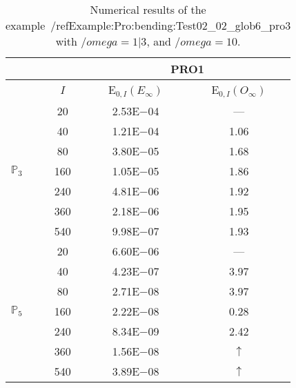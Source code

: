 \begin{table}[H]
\caption{Numerical results of the example~/ref{Example:Pro:bending:Test02_02_glob6_pro3} with $/omega=1|3$, and $/omega=10$.}
\setlength{\tabcolsep}{5pt}
\centering
\begin{tabular}{@{}l c c c@{}}
\toprule
 &  & \multicolumn{2}{c}{PRO1}\\
\midrule
 & $I$ & E$_{0,I}(E_{\infty})$ & E$_{0,I}(O_{\infty})$\\
\midrule
\multirow{7}{*}{$\mathbb{P}_{3}$}
 & 20 & 2.53E$-$04 & ---\\
 & 40 & 1.21E$-$04 & 1.06\\
 & 80 & 3.80E$-$05 & 1.68\\
 & 160 & 1.05E$-$05 & 1.86\\
 & 240 & 4.81E$-$06 & 1.92\\
 & 360 & 2.18E$-$06 & 1.95\\
 & 540 & 9.98E$-$07 & 1.93\\
\midrule
\multirow{7}{*}{$\mathbb{P}_{5}$}
 & 20 & 6.60E$-$06 & ---\\
 & 40 & 4.23E$-$07 & 3.97\\
 & 80 & 2.71E$-$08 & 3.97\\
 & 160 & 2.22E$-$08 & 0.28\\
 & 240 & 8.34E$-$09 & 2.42\\
 & 360 & 1.56E$-$08 & $\uparrow$\\
 & 540 & 3.89E$-$08 & $\uparrow$\\
\bottomrule
\end{tabular}
\label{Table:PRO:test_02_02_test24_pro3}
\end{table}
